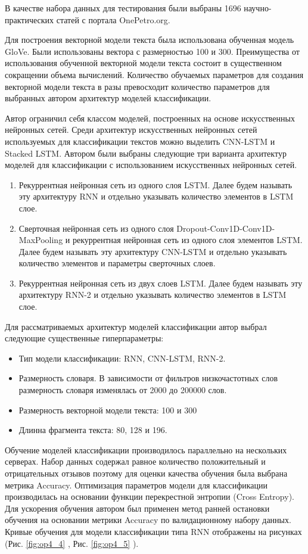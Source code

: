 В качестве набора данных для тестирования были выбраны 1696 научно-практических статей с портала OnePetro.org.  

Для построения векторной модели текста была использована обученная модель GloVe. 
Были использованы вектора с размерностью 100 и 300. 
Преимущества от использования обученной векторной модели текста состоит в существенном сокращении объема вычислений.
Количество обучаемых параметров для создания векторной модели текста в разы превосходит количество параметров для выбранных автором архитектур моделей классификации. 

Автор ограничил себя классом моделей, построенных на основе искусственных нейронных сетей. 
Среди архитектур искусственных нейронных сетей используемых для классификации текстов можно выделить CNN-LSTM и Stacked LSTM.  
Автором были выбраны следующие три варианта архитектур моделей для классификации с использованием искусственных нейронных сетей.

\begin{enumerate}
\tightlist
\item Рекуррентная нейронная сеть из одного слоя LSTM.  Далее будем называть эту архитектуру RNN и отдельно указывать количество элементов в LSTM слое.
\item Сверточная нейронная сеть из одного слоя Dropout-Conv1D-Conv1D-MaxPooling и рекуррентная нейронная сеть из одного слоя элементов LSTM. Далее будем называть эту архитектуру CNN-LSTM и отдельно указывать количество элементов и параметры сверточных слоев.
\item Рекуррентная нейронная сеть из двух слоев LSTM. Далее будем называть эту архитектуру RNN-2 и отдельно указывать количество элементов в LSTM слое.
\end{enumerate}

Для рассматриваемых архитектур моделей классификации автор выбрал следующие существенные гиперпараметры:
\begin{itemize}
\tightlist
\item Тип модели классификации: RNN, CNN-LSTM, RNN-2.
\item Размерность словаря. В зависимости от фильтров низкочастотных слов размерность словаря изменялась от 2000 до 200000 слов.
\item Размерность векторной модели текста: 100 и 300
\item Длинна фрагмента текста: 80, 128 и 196.
\end{itemize}

Обучение моделей классификации производилось параллельно на нескольких серверах. 
Набор данных содержал равное количество положительный и отрицательных отзывов поэтому для оценки качества обучения была выбрана метрика Accuracy. 
Оптимизация параметров модели для классификации производилась на основании функции перекрестной энтропии (Cross Entropy). 
Для ускорения обучения автором был применен метод ранней остановки обучения на основании метрики Accuracy по валидационному набору данных. Кривые обучения для модели классификации типа RNN отображены на рисунках (Рис. \ref{fig:op4_4} , Рис. \ref{fig:op4_5} ).

